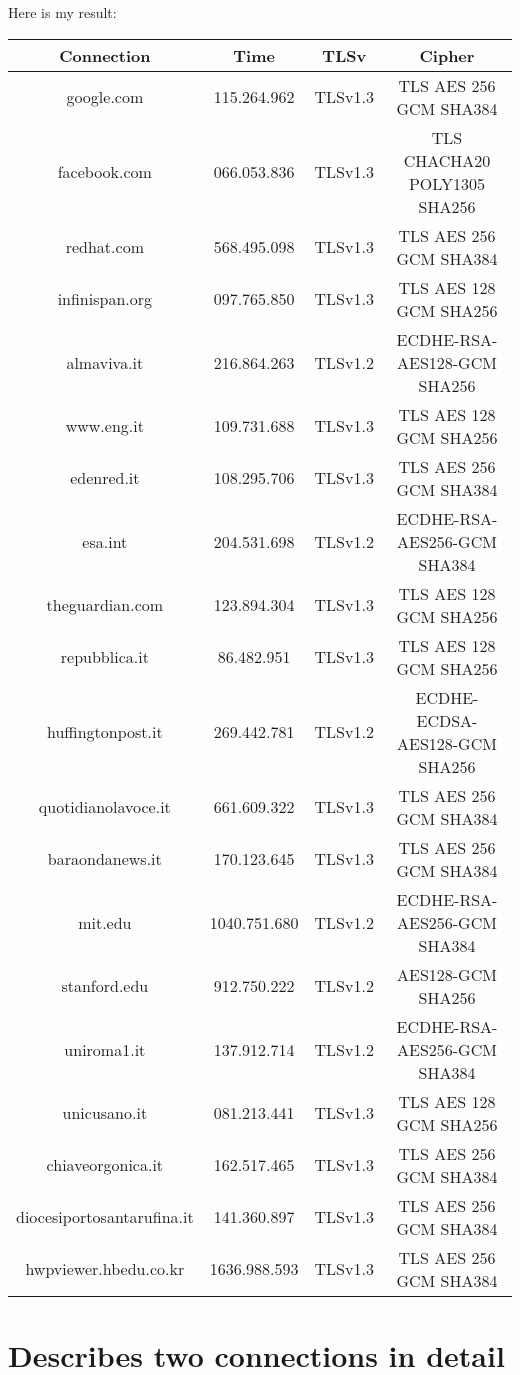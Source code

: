 \documentclass{article}
\begin{document}
\noindent Here is my result:

\bigbreak
\begin{tabular}{ c c c c }
\textbf{Connection} & \textbf{Time} & \textbf{TLSv} & \textbf{Cipher}  \\ 
\hline
google.com & 115.264.962 & TLSv1.3 & TLS AES 256 GCM SHA384 \\
facebook.com & 066.053.836 & TLSv1.3 & TLS CHACHA20 POLY1305 SHA256 \\
redhat.com & 568.495.098 & TLSv1.3 & TLS AES 256 GCM SHA384 \\
infinispan.org & 097.765.850 & TLSv1.3 & TLS AES 128 GCM SHA256 \\
almaviva.it & 216.864.263 & TLSv1.2 & ECDHE-RSA-AES128-GCM SHA256 \\
www.eng.it & 109.731.688 & TLSv1.3 & TLS AES 128 GCM SHA256 \\
edenred.it & 108.295.706 & TLSv1.3 & TLS AES 256 GCM SHA384 \\
esa.int & 204.531.698 & TLSv1.2 & ECDHE-RSA-AES256-GCM SHA384 \\
theguardian.com & 123.894.304 & TLSv1.3 & TLS AES 128 GCM SHA256 \\
repubblica.it& 86.482.951 & TLSv1.3 & TLS AES 128 GCM SHA256 \\
huffingtonpost.it & 269.442.781 & TLSv1.2 & ECDHE-ECDSA-AES128-GCM SHA256 \\
quotidianolavoce.it & 661.609.322 & TLSv1.3 & TLS AES 256 GCM SHA384 \\
baraondanews.it & 170.123.645 & TLSv1.3 & TLS AES 256 GCM SHA384 \\
mit.edu & 1040.751.680 & TLSv1.2 & ECDHE-RSA-AES256-GCM SHA384 \\
stanford.edu & 912.750.222 & TLSv1.2 & AES128-GCM SHA256 \\
uniroma1.it & 137.912.714 & TLSv1.2 & ECDHE-RSA-AES256-GCM SHA384 \\
unicusano.it & 081.213.441 & TLSv1.3 & TLS AES 128 GCM SHA256 \\
chiaveorgonica.it & 162.517.465 & TLSv1.3 & TLS AES 256 GCM SHA384 \\
diocesiportosantarufina.it & 141.360.897 & TLSv1.3 & TLS AES 256 GCM SHA384 \\
hwpviewer.hbedu.co.kr & 1636.988.593 & TLSv1.3 & TLS AES 256 GCM SHA384 \\
\end{tabular}
\bigbreak

\section{Describes two connections in detail}
\end{document}
